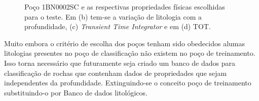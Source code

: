 \begin{figure}[H]
	\qquad
	\qquad
	\caption{Poço 1BN0002SC e as respectivas propriedades físicas escolhidas para o teste. Em (b) tem-se a variação de litologia com a profundidade, (c) \textit{Transient Time Integrator} e em (d) TOT.}
	\label{1BN0002SCb}
\end{figure}

Muito embora o critério de escolha dos poços tenham sido obedecidos alumas litologias presentes no poço de classificação não existem no poço de treinamento. Isso torna necessário que futuramente seja criado um banco de dados para classificação de rochas que contenham dados de propriedades que sejam independentes da profundidade. Extinguindo-se o conceito poço de treinamento substituindo-o por Banco de dados litológicos. 
   

